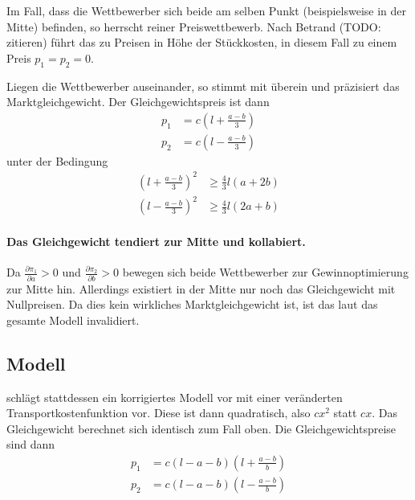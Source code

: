 Im Fall, dass die Wettbewerber sich beide am selben Punkt (beispielsweise in der Mitte) befinden, so herrscht reiner Preiswettbewerb. Nach Betrand (TODO: zitieren) führt das zu Preisen in Höhe der Stückkosten, in diesem Fall zu einem Preis $p_1=p_2=0$.

Liegen die Wettbewerber auseinander, so stimmt \citet{aspremont1979} mit \citet{hotelling1929} überein und präzisiert das Marktgleichgewicht. Der Gleichgewichtspreis ist dann
\begin{equation}
\begin{split}
p_1 &= c \left(l+\frac{a-b}{3}\right) \\
p_2 &= c \left(l-\frac{a-b}{3}\right)
\end{split}
\end{equation}
unter der Bedingung
\begin{equation}
\begin{split}
\left(l+\frac{a-b}{3}\right)^2 &\geq \tfrac{4}{3} l (a+2b) \\
\left(l-\frac{a-b}{3}\right)^2 &\geq \tfrac{4}{3} l (2a+b)
\end{split}
\end{equation}

\paragraph{Das Gleichgewicht tendiert zur Mitte und kollabiert.} Da $\frac{\partial \pi_1}{\partial a}>0$ und $\frac{\partial \pi_2}{\partial b}>0$ bewegen sich beide Wettbewerber zur Gewinnoptimierung zur Mitte hin. Allerdings existiert in der Mitte nur noch das Gleichgewicht mit Nullpreisen. Da dies kein wirkliches Marktgleichgewicht ist, ist das laut \citet{aspremont1979} das gesamte Modell invalidiert.

\subsection{Modell}\label{Sec-Aspremont-Modell}
\citet{aspremont1979} schlägt stattdessen ein korrigiertes Modell vor mit einer veränderten Transportkostenfunktion vor. Diese ist dann quadratisch, also $cx^2$ statt $cx$.
Das Gleichgewicht berechnet sich identisch zum Fall oben. Die Gleichgewichtspreise sind dann
\begin{equation}
\begin{split}
p_1 &= c (l-a-b) \left(l+\frac{a-b}{b}\right) \\
p_2 &= c (l-a-b) \left(l-\frac{a-b}{b}\right)
\end{split}
\end{equation}

